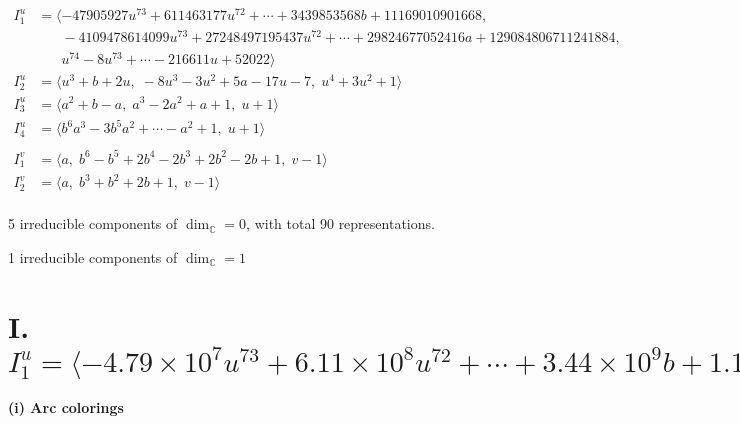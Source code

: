 \documentclass[1p]{elsarticle_modified}
\theoremstyle{definition}
\begin{document}
\begin{align*}
I^u_{1}&=\langle 
-47905927 u^{73}+611463177 u^{72}+\cdots+3439853568 b+11169010901668,\\
\phantom{I^u_{1}}&\phantom{= \langle  }-4109478614099 u^{73}+27248497195437 u^{72}+\cdots+29824677052416 a+129084806711241884,\\
\phantom{I^u_{1}}&\phantom{= \langle  }u^{74}-8 u^{73}+\cdots-216611 u+52022\rangle \\
I^u_{2}&=\langle 
u^3+b+2 u,\;-8 u^3-3 u^2+5 a-17 u-7,\;u^4+3 u^2+1\rangle \\
I^u_{3}&=\langle 
a^2+b- a,\;a^3-2 a^2+a+1,\;u+1\rangle \\
I^u_{4}&=\langle 
b^6 a^3-3 b^5 a^2+\cdots- a^2+1,\;u+1\rangle \\
\\
I^v_{1}&=\langle 
a,\;b^6- b^5+2 b^4-2 b^3+2 b^2-2 b+1,\;v-1\rangle \\
I^v_{2}&=\langle 
a,\;b^3+b^2+2 b+1,\;v-1\rangle \\
\end{align*}
\raggedright * 5 irreducible components of $\dim_{\mathbb{C}}=0$, with total 90 representations.\\
\raggedright * 1 irreducible components of $\dim_{\mathbb{C}}=1$ \\
\newpage
\renewcommand{\arraystretch}{1}
\centering \section*{I. $I^u_{1}= \langle -4.79\times10^{7} u^{73}+6.11\times10^{8} u^{72}+\cdots+3.44\times10^{9} b+1.12\times10^{13},\;-4.11\times10^{12} u^{73}+2.72\times10^{13} u^{72}+\cdots+2.98\times10^{13} a+1.29\times10^{17},\;u^{74}-8 u^{73}+\cdots-216611 u+52022 \rangle$}
\flushleft \textbf{(i) Arc colorings}\\
\end{document}
